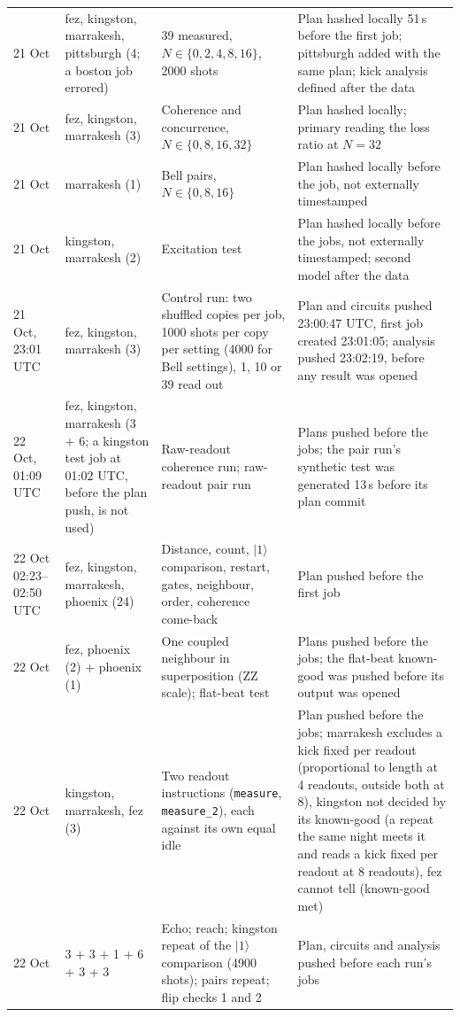 \documentclass[reprint,amsmath,amssymb,aps,superscriptaddress,nofootinbib]{revtex4-2}
\begin{document}
\begin{table}[!tp]
\begin{tabular}{p{2.3cm}p{3.6cm}p{6.3cm}p{4.9cm}}
21 Oct & fez, kingston, marrakesh, pittsburgh (4; a boston job errored) & 39 measured, $N\in\{0,2,4,8,16\}$, 2000 shots & Plan hashed locally 51\,s before the first job; pittsburgh added with the same plan; kick analysis defined after the data \\
21 Oct & fez, kingston, marrakesh (3) & Coherence and concurrence, $N\in\{0,8,16,32\}$ & Plan hashed locally; primary reading the loss ratio at $N=32$ \\
21 Oct & marrakesh (1) & Bell pairs, $N\in\{0,8,16\}$ & Plan hashed locally before the job, not externally timestamped \\
21 Oct & kingston, marrakesh (2) & Excitation test & Plan hashed locally before the jobs, not externally timestamped; second model after the data \\
21 Oct, 23:01 UTC & fez, kingston, marrakesh (3) & Control run: two shuffled copies per job, 1000 shots per copy per setting (4000 for Bell settings), 1, 10 or 39 read out & Plan and circuits pushed 23:00:47 UTC, first job created 23:01:05; analysis pushed 23:02:19, before any result was opened \\
22 Oct, 01:09 UTC & fez, kingston, marrakesh (3 + 6; a kingston test job at 01:02 UTC, before the plan push, is not used) & Raw-readout coherence run; raw-readout pair run & Plans pushed before the jobs; the pair run's synthetic test was generated 13\,s before its plan commit \\
22 Oct 02:23--02:50 UTC & fez, kingston, marrakesh, phoenix (24) & Distance, count, $|1\rangle$ comparison, restart, gates, neighbour, order, coherence come-back & Plan pushed before the first job \\
22 Oct & fez, phoenix (2) + phoenix (1) & One coupled neighbour in superposition (ZZ scale); flat-beat test & Plans pushed before the jobs; the flat-beat known-good was pushed before its output was opened \\
22 Oct & kingston, marrakesh, fez (3) & Two readout instructions (\texttt{measure}, \texttt{measure\_2}), each against its own equal idle & Plan pushed before the jobs; marrakesh excludes a kick fixed per readout (proportional to length at 4 readouts, outside both at 8), kingston not decided by its known-good (a repeat the same night meets it and reads a kick fixed per readout at 8 readouts), fez cannot tell (known-good met) \\
22 Oct & 3 + 3 + 1 + 6 + 3 + 3 & Echo; reach; kingston repeat of the $|1\rangle$ comparison (4900 shots); pairs repeat; flip checks 1 and 2 & Plan, circuits and analysis pushed before each run's jobs \\

\end{tabular}
\end{table}
\end{document}
